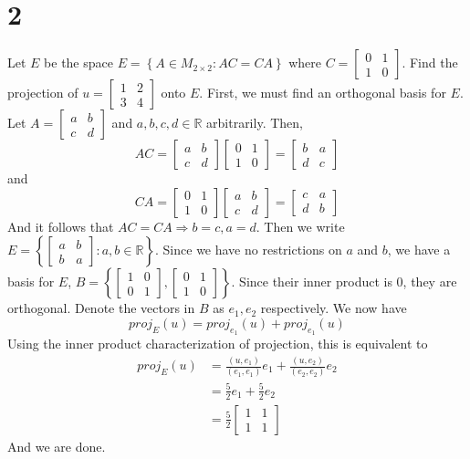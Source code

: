 \documentclass{article}
\begin{document}
\section*{2}
Let $E$ be the space $E = \left\{ A \in M_{2\times2} : AC = CA\right\}$ where $C = \begin{bmatrix}0&1\\1&0\end{bmatrix}$. Find the projection of $u = \begin{bmatrix}1&2\\3&4\end{bmatrix}$ onto $E$. First, we must find an orthogonal basis for $E$. Let $A = \begin{bmatrix}a&b\\c&d\end{bmatrix}$ and $a,b,c,d \in \mathbb{R}$ arbitrarily. Then,
\[ AC = \begin{bmatrix}a&b\\c&d\end{bmatrix} \begin{bmatrix}0&1\\1&0\end{bmatrix} = \begin{bmatrix}b&a\\d&c\end{bmatrix} \]
and 
\[ CA = \begin{bmatrix}0&1\\1&0\end{bmatrix} \begin{bmatrix}a&b\\c&d\end{bmatrix} = \begin{bmatrix}c&a\\d&b\end{bmatrix} \]
And it follows that $AC = CA \Rightarrow b = c, a=d$. Then we write $E = \left\{ \begin{bmatrix}a&b\\b&a\end{bmatrix}  : a,b \in \mathbb{R} \right\}$. Since we have no restrictions on $a$ and $b$, we have a basis for $E$, $B = \left\{\begin{bmatrix}1&0\\0&1\end{bmatrix}, \begin{bmatrix}0&1\\1&0\end{bmatrix} \right\}$. Since their inner product is 0, they are orthogonal. Denote the vectors in $B$ as $e_1, e_2$ respectively. We now have
\[ proj_E(u) = proj_{e_1}(u) + proj_{e_1}(u) \]
Using the inner product characterization of projection, this is equivalent to
\begin{align*}
proj_E(u) & = \frac{\left(u,e_1\right)}{\left(e_1,e_1\right)}e_1 + \frac{\left(u,e_2\right)}{\left(e_2,e_2\right)}e_2 \\
& = \frac{5}{2}e_1 + \frac{5}{2}e_2\\
& = \frac{5}{2}\begin{bmatrix}1&1\\1&1\end{bmatrix}
\end{align*}
And we are done.
\end{document}
